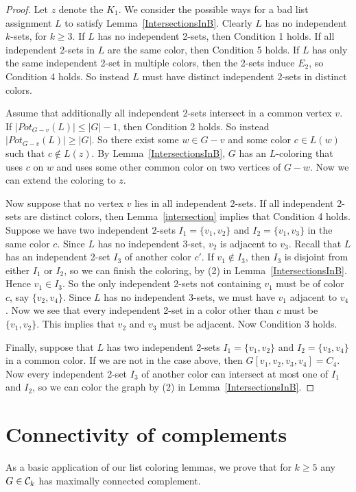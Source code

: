\begin{proof}
Let $z$ denote the $K_1$.  We consider the possible ways for a bad list
assignment $L$ to satisfy Lemma~\ref{IntersectionsInB}.  Clearly $L$ has no
independent $k$-sets, for
$k\ge 3$.  If $L$ has no independent 2-sets, then Condition 1 holds.
If all independent 2-sets in $L$ are the same color, then Condition 5 holds.
If $L$ has only the same independent 2-set in multiple colors, then the 2-sets
induce $E_2$, so Condition 4 holds.
So instead $L$ must have distinct independent 2-sets in distinct colors.

Assume that additionally all independent 2-sets intersect in a common vertex
$v$.  
If $|Pot_{G-v}(L)|\le |G|-1$, then
Condition 2 holds.
So instead $|Pot_{G-v}(L)|\ge|G|$.  So there exist some $w\in G-v$ and some
color $c\in L(w)$ such that $c\notin L(z)$.  By Lemma~\ref{IntersectionsInB},
$G$ has an $L$-coloring that uses $c$ on $w$ and uses some other common color
on two vertices of $G-w$.  Now we can extend the coloring to $z$.

Now suppose that no vertex $v$ lies in all independent 2-sets.  If all
independent 2-sets are distinct colors, then Lemma~\ref{intersection} implies
that Condition 4 holds.  Suppose we have two independent 2-sets
$I_1=\{v_1,v_2\}$ and $I_2=\{v_1,v_3\}$ in the same color $c$.  Since $L$ has
no independent 3-set, $v_2$ is adjacent to $v_3$.  Recall that $L$ has an
independent 2-set $I_3$ of
another color $c'$.  If $v_1\notin I_3$, then $I_3$ is disjoint from either
$I_1$ or $I_2$, so we can finish the coloring, by (2) in
Lemma~\ref{IntersectionsInB}.  Hence $v_1\in I_3$.  So the only independent
2-sets not containing $v_1$ must be of color $c$, say $\{v_2, v_4\}$.  Since $L$
has no independent 3-sets, we must have $v_1$ adjacent to $v_4$.  Now we see
that every independent 2-set in a color other than $c$ must be $\{v_1,v_2\}$.
This implies that $v_2$ and $v_3$ must be adjacent.  Now Condition 3 holds.

Finally, suppose that $L$ has two independent 2-sets $I_1=\{v_1,v_2\}$ and
$I_2=\{v_3,v_4\}$ in a common color.  If we are not in the case above, then
$G[v_1,v_2,v_3,v_4]=C_4$.  Now every independent 2-set $I_3$ of another color
can intersect at most one of $I_1$ and $I_2$, so we can color the graph by (2)
in Lemma~\ref{IntersectionsInB}.
\end{proof}

\section{Connectivity of complements}
As a basic application of our list coloring lemmas, we prove that for $k \geq
5$ any $G \in \mathcal{C}_{k}$ has maximally connected complement.

